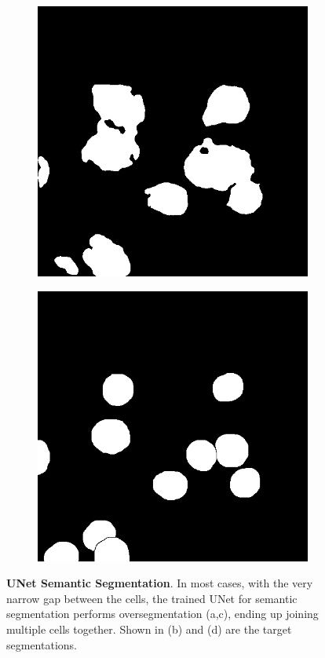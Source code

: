 \documentclass[10pt, journal, compsoc]{IEEEtran}
\begin{document}
\begin{figure}
\begin{subfigure}[b]{0.49\linewidth}
\caption{}
\end{subfigure}
\begin{subfigure}[b]{0.49\linewidth}
\includegraphics[width=\linewidth]{c127/unet/108641-semantic.jpg}
\caption{}
\end{subfigure}
\begin{subfigure}[b]{0.49\linewidth}
\includegraphics[width=\linewidth]{c127/108641-label.jpg}
\caption{}
\end{subfigure}
\caption{\textbf{UNet Semantic Segmentation}. In most cases, with the very narrow gap between the cells, the trained UNet for semantic segmentation performs oversegmentation (a,c), ending up joining multiple cells together. Shown in (b) and (d) are the target segmentations.}
\label{fig:unet_results}
\end{figure}
\end{document}
